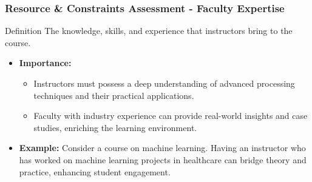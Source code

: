 \documentclass[aspectratio=169]{beamer}
\begin{document}
\begin{frame}[fragile]
    \frametitle{Resource \& Constraints Assessment - Faculty Expertise}
    \begin{block}{Definition}
        The knowledge, skills, and experience that instructors bring to the course.
    \end{block}
    \begin{itemize}
        \item \textbf{Importance:}
        \begin{itemize}
            \item Instructors must possess a deep understanding of advanced processing techniques and their practical applications.
            \item Faculty with industry experience can provide real-world insights and case studies, enriching the learning environment.
        \end{itemize}
        \item \textbf{Example:} 
        Consider a course on machine learning. Having an instructor who has worked on machine learning projects in healthcare can bridge theory and practice, enhancing student engagement.
    \end{itemize}
\end{frame}
\end{document}
